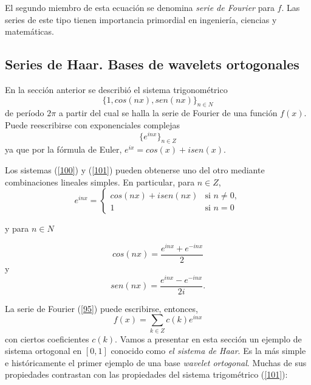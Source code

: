  
 
 El segundo miembro de esta ecuación se denomina \textit{serie de Fourier} para $f$.
 Las series de este tipo tienen importancia primordial en ingeniería, ciencias y matemáticas.
 
 
\bigskip


\subsection{Series de Haar. Bases de wavelets ortogonales}
En la sección anterior se describió el sistema trigonométrico
\begin{equation}
   \{1, cos(nx), sen(nx)\}_{n \in N}
   \label{100}
    \end{equation}
    de período $2\pi$
a partir del cual se halla la serie de Fourier de una función $f(x)$.
Puede reescribirse con exponenciales complejas 
\begin{equation}
   \{e^{inx}\}_{n \in Z}
   \label{101}
    \end{equation}
ya que por  la fórmula de Euler,  $e^{ix}=cos(x)+ i sen(x)$. 

Los sistemas (\ref{100}) y (\ref{101})  pueden obtenerse uno del otro mediante combinaciones lineales simples.
En particular, para $n \in Z$, 
\[
e^{inx}=\left\{
\begin{array}{ll}
   cos(nx)+ i sen(nx)  & \mbox{si $n \ne 0$}, \\
    1 & \mbox{si $n = 0$}
\end{array}
\right.
\]

y para $n \in N$

\[
cos(nx)=\frac{e^{inx}+e^{-inx}}{2}
\]
y 
 \[
sen(nx)=\frac{e^{inx}-e^{-inx}}{2i}.
\]  

La serie de Fourier (\ref{95}) puede escribirse, entonces, 
\begin{equation}
   f(x) =   \sum_{k \in Z} c(k) e^{inx}  
   \label{105} 
 \end{equation} 
 con ciertos coeficientes $c(k)$.
 Vamos a presentar en esta sección un ejemplo de sistema ortogonal en $[0,1]$ conocido como \textit{el sistema de  Haar}. Es la más simple e históricamente el primer ejemplo de una base \textit{wavelet ortogonal}. Muchas de sus propiedades contrastan con las propiedades del sistema trigométrico  (\ref{101}):
 

